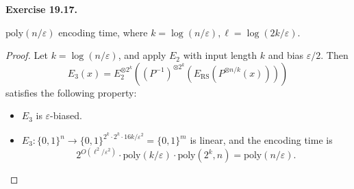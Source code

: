 \documentclass[a4paper]{article}
\newenvironment{exercise}[1]{
	\par
	\noindent\textbf{Exercise #1.}\quad
}{
	\par
	\bigskip
}
\newcommand{\pbra}[1]{\left( #1 \right)}
\newcommand{\bin}{\{0,1\}}
\newcommand{\eps}{\varepsilon}
\newcommand{\poly}{\text{poly}}
\begin{document}
\begin{exercise}{19.17}
\begin{itemize}
\begin{itemize}
                        $\poly(n/\eps)$ encoding time, where $k=\log(n/\eps),\ell=\log(2k/\eps)$.
                        \begin{proof}
                        Let $k=\log(n/\eps)$, and apply $E_2$ with input length $k$ and bias $\eps/2$. Then 
                            $$
                            E_3(x)=E_2^{\otimes 2^k}\pbra{(P^{-1})^{\otimes 2^k}\pbra{E_\text{RS}\pbra{P^{\otimes n/k}(x)}}}
                            $$ 
                            satisfies the following property:
                            \begin{itemize}
                                \item $E_3$ is $\eps$-biased.                            
                                \item $E_3:\bin^n\to\bin^{2^k\cdot 2^k\cdot16k/\eps^2}=\bin^m$ is linear, 
                                    and the encoding time is 
                                    $$
                                    2^{O(\ell^2/\eps^2)}\cdot\poly(k/\eps)\cdot\poly(2^k,n)=\poly(n/\eps).
                                    $$
                            \end{itemize}
                        \end{proof}
                \end{itemize}
        \end{itemize}
    \end{exercise}
\end{document}
